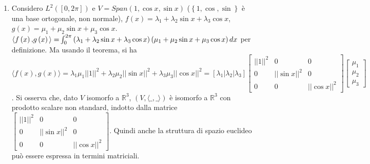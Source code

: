 \documentclass{article}
\begin{document}
\begin{enumerate}
\item Considero $L^{2}\left( \left[ 0,2\pi \right] \right) $ e $V=Span\left(
1,\cos x,\sin x\right) $ ($\left\{ 1,\cos ,\sin \right\} $ \`{e} una base
ortogonale, non normale), $f\left( x\right) =\lambda _{1}+\lambda _{2}\sin
x+\lambda _{3}\cos x$, $g\left( x\right) =\mu _{1}+\mu _{2}\sin x+\mu
_{3}\cos x$. $\langle f\left( x\right) \mathbf{,}g\left( x\right) \mathbf{%
\rangle =}\int_{0}^{2\pi }\left( \lambda _{1}+\lambda _{2}\sin x+\lambda
_{3}\cos x\right) \left( \mu _{1}+\mu _{2}\sin x+\mu _{3}\cos x\right) dx$
per definizione. Ma usando il teorema, si ha $\langle f\left( x\right) 
\mathbf{,}g\left( x\right) \rangle =\lambda _{1}\mu _{1}\left\vert
\left\vert 1\right\vert \right\vert ^{2}+\lambda _{2}\mu _{2}\left\vert
\left\vert \sin x\right\vert \right\vert ^{2}+\lambda _{3}\mu _{3}\left\vert
\left\vert \cos x\right\vert \right\vert ^{2}=\left[ \lambda _{1}|\lambda
_{2}|\lambda _{3}\right] \left[ 
\begin{array}{ccc}
\left\vert \left\vert 1\right\vert \right\vert ^{2} & 0 & 0 \\ 
0 & \left\vert \left\vert \sin x\right\vert \right\vert ^{2} & 0 \\ 
0 & 0 & \left\vert \left\vert \cos x\right\vert \right\vert ^{2}%
\end{array}%
\right] \left[ 
\begin{array}{c}
\mu _{1} \\ 
\mu _{2} \\ 
\mu _{3}%
\end{array}%
\right] $. Si osserva che, dato $V$ isomorfo a $%
\mathbb{R}
^{3}$, $\left( V,\langle \_\mathbf{,}\_\rangle \right) $ \`{e} isomorfo a $%
\mathbb{R}
^{3}$ con prodotto scalare non standard, indotto dalla matrice $\left[ 
\begin{array}{ccc}
\left\vert \left\vert 1\right\vert \right\vert ^{2} & 0 & 0 \\ 
0 & \left\vert \left\vert \sin x\right\vert \right\vert ^{2} & 0 \\ 
0 & 0 & \left\vert \left\vert \cos x\right\vert \right\vert ^{2}%
\end{array}%
\right] $. Quindi anche la struttura di spazio euclideo pu\`{o} essere
espressa in termini matriciali.


\end{enumerate}
\end{document}
